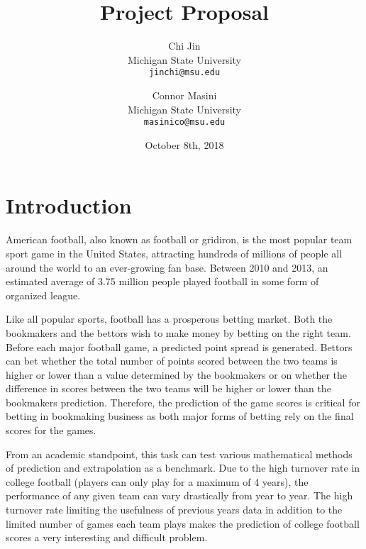 \documentclass[10pt,twocolumn,letterpaper]{article}
\title{Project Proposal}
\author{Chi Jin \\
Michigan State University \\
{\tt\small jinchi@msu.edu}
\and
Connor Masini\\
Michigan State University\\
{\tt\small masinico@msu.edu}
\date{October 8th, 2018}
}
\begin{document}
\maketitle

\section{Introduction}
American football, also known as football or gridiron, is the most popular team sport game in the United States\cite{favsport}, attracting hundreds of millions of people all around the world to an ever-growing fan base. Between 2010 and 2013, an estimated average of 3.75 million people played football in some form of organized league. \cite{ncaa}
 
Like all popular sports, football has a prosperous betting market. Both the bookmakers and the bettors wish to make money by betting on the right team. Before each major football game, a predicted point spread is generated. Bettors can bet whether the total number of points scored between the two teams is higher or lower than a value determined by the bookmakers or on whether the difference in scores between the two teams will be higher or lower than the bookmakers prediction. Therefore, the prediction of the game scores is critical for betting in bookmaking business as both major forms of betting rely on the final scores for the games.

From an academic standpoint, this task can test various mathematical methods of prediction and extrapolation as a benchmark\cite{forcast}. Due to the high turnover rate in college football (players can only play for a maximum of 4 years), the performance of any given team can vary drastically from year to year. The high turnover rate limiting the usefulness of previous years data in addition to the limited number of games each team plays makes the prediction of college football scores a very interesting and difficult problem. 
\end{document}
